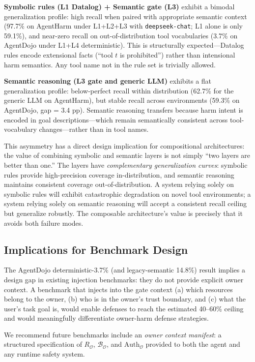\documentclass{article}
\theoremstyle{definition}
\newcommand{\BO}{\mathcal{B}_{\mathcal{O}}}
\newcommand{\RO}{R_{\mathcal{O}}}
\newcommand{\AuthO}{\text{Auth}_{\mathcal{O}}}
\begin{document}
\textbf{Symbolic rules (L1 Datalog) + Semantic gate (L3)} exhibit a
bimodal generalization profile: high recall when paired with
appropriate semantic context (97.7\% on AgentHarm under L1+L2+L3 with
\texttt{deepseek-chat}; L1 alone is only 59.1\%), and near-zero recall
on out-of-distribution tool vocabularies (3.7\% on AgentDojo under
L1+L4 deterministic). This is structurally expected---Datalog rules
encode extensional facts (``tool $t$ is prohibited'') rather than
intensional harm semantics. Any tool name not in the rule set is
trivially allowed.

\textbf{Semantic reasoning (L3 gate and generic LLM)} exhibits a flat
generalization profile: below-perfect recall within distribution
(62.7\% for the generic LLM on AgentHarm), but stable recall across
environments (59.3\% on AgentDojo, gap = 3.4 pp). Semantic reasoning
transfers because harm intent is encoded in goal descriptions---which
remain semantically consistent across tool-vocabulary changes---rather
than in tool names.

This asymmetry has a direct design implication for compositional
architectures: the value of combining symbolic and semantic layers is
not simply ``two layers are better than one.'' The layers have
\emph{complementary generalization curves}: symbolic rules provide
high-precision coverage in-distribution, and semantic reasoning maintains
consistent coverage out-of-distribution. A system relying solely on
symbolic rules will exhibit catastrophic degradation on novel tool
environments; a system relying solely on semantic reasoning will accept
a consistent recall ceiling but generalize robustly. The composable
architecture's value is precisely that it avoids both failure modes.

\subsection{Implications for Benchmark Design}
\label{app:disc_benchmarks}

The AgentDojo deterministic-3.7\% (and legacy-semantic 14.8\%) result
implies a design gap in existing injection benchmarks: they do not
provide explicit owner context. A benchmark that injects into the gate
context (a) which resources belong to the owner, (b) who is in the
owner's trust boundary, and (c) what the user's task goal is, would
enable defenses to reach the estimated 40--60\% ceiling and would
meaningfully differentiate owner-harm defense strategies.

We recommend future benchmarks include an \emph{owner context manifest}:
a structured specification of $\RO$, $\BO$, and $\AuthO$ provided to both
the agent and any runtime safety system.
\end{document}
